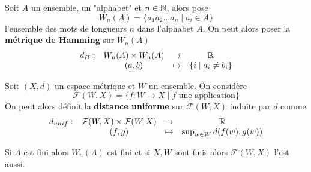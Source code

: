 \begin{exemple} \label{ex: Métrique de Hamming}
	Soit $A$ un ensemble, un "alphabet" et $n \in \mathbb{N}$, alors pose 
	\[
	W_n(A) = \{a_1 a_2 \ldots a_n \mid a_i \in A\}
	\]
	l'ensemble des mots de longueurs $n$ dans l'alphabet $A$. On peut alors poser la \textbf{métrique de Hamming} sur $W_n(A)$
	\[
	\begin{array}{cccc}
		d_H : & W_n(A) \times W_n(A) & \to & \mathbb{R} \\
			& (\underline a, \underline b) & \mapsto & \{i \mid a_i \neq b_i\}
	\end{array}
	\]
\end{exemple}

\begin{exemple} \label{ex: Distance uniforme}
	Soit $(X,d)$ un espace métrique et $W$ un ensemble. On considère
	\[
	\mathcal F(W,X) = \{ f: W \to X \mid f \text{ une application}\}
	\]
	On peut alors définit la \textbf{distance uniforme} sur $\mathcal F(W,X)$ induite par $d$ comme
	\[
	\begin{array}{cccc}
		d_{unif} : & \mathcal F(W,X) \times \mathcal F(W,X) & \to & \mathbb{R} \\
					& (f,g) & \mapsto & \sup_{w \in W} d(f(w), g(w))
	\end{array}
	\]
\end{exemple}

\begin{remarque}
	Si $A$ est fini alors \hyperref[ex: Métrique de Hamming]{$W_n(A)$} est fini et si $X, W$ sont finis alors \hyperref[ex: Distance uniforme]{$\mathcal F(W,X)$} l'est aussi.
\end{remarque}